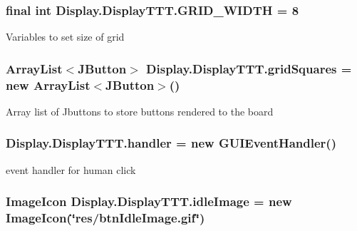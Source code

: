 \subsubsection[{G\+R\+I\+D\+\_\+\+W\+I\+D\+T\+H}]{\setlength{\rightskip}{0pt plus 5cm}final int Display.\+Display\+T\+T\+T.\+G\+R\+I\+D\+\_\+\+W\+I\+D\+T\+H = 8\hspace{0.3cm}{\ttfamily [static]}}\label{class_display_1_1_display_t_t_t_ac07e05126f3b772dd62b3276defc0b4b}
Variables to set size of grid \hypertarget{class_display_1_1_display_t_t_t_af2ce89b88ce5f8ccae426f4f273d52aa}{}
\subsubsection[{grid\+Squares}]{\setlength{\rightskip}{0pt plus 5cm}Array\+List$<$J\+Button$>$ Display.\+Display\+T\+T\+T.\+grid\+Squares = new Array\+List$<$J\+Button$>$()\hspace{0.3cm}{\ttfamily [private]}}\label{class_display_1_1_display_t_t_t_af2ce89b88ce5f8ccae426f4f273d52aa}
Array list of Jbuttons to store buttons rendered to the board \hypertarget{class_display_1_1_display_t_t_t_a834294acca3e75ec3d75e52ecd6028bc}{}
\subsubsection[{handler}]{ Display.\+Display\+T\+T\+T.\+handler = new {\bf G\+U\+I\+Event\+Handler}()\hspace{0.3cm}{\ttfamily [private]}}\label{class_display_1_1_display_t_t_t_a834294acca3e75ec3d75e52ecd6028bc}
event handler for human click \hypertarget{class_display_1_1_display_t_t_t_a9f22db838fa2492c00c8466efb8eebd5}{}
\subsubsection[{idle\+Image}]{\setlength{\rightskip}{0pt plus 5cm}Image\+Icon Display.\+Display\+T\+T\+T.\+idle\+Image = new Image\+Icon(\char`\"{}res/btn\+Idle\+Image.\+gif\char`\"{})\hspace{0.3cm}{\ttfamily [private]}}\label{class_display_1_1_display_t_t_t_a9f22db838fa2492c00c8466efb8eebd5}
\hypertarget{class_display_1_1_display_t_t_t_a713fdaab41d88af675c9f54dfcdb87a2}{}
